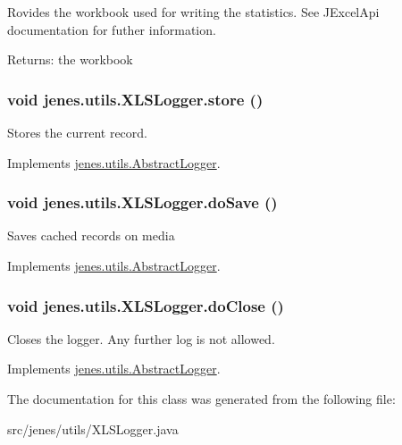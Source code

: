 Rovides the workbook used for writing the statistics. See JExcelApi documentation for futher information.

\begin{Desc}
\item[Returns:]the workbook \end{Desc}
\hypertarget{classjenes_1_1utils_1_1_x_l_s_logger_e6b3840ad6be8bdc558efaf6077d4ae4}{
\subsubsection[store]{\setlength{\rightskip}{0pt plus 5cm}void jenes.utils.XLSLogger.store ()}}
\label{classjenes_1_1utils_1_1_x_l_s_logger_e6b3840ad6be8bdc558efaf6077d4ae4}


Stores the current record. 

Implements \hyperlink{classjenes_1_1utils_1_1_abstract_logger_6acf83a83999e26ae4ed45cbf355111b}{jenes.utils.AbstractLogger}.\hypertarget{classjenes_1_1utils_1_1_x_l_s_logger_54c54393bf5a31442ebfc10517dfceea}{
\subsubsection[doSave]{\setlength{\rightskip}{0pt plus 5cm}void jenes.utils.XLSLogger.doSave ()}}
\label{classjenes_1_1utils_1_1_x_l_s_logger_54c54393bf5a31442ebfc10517dfceea}


Saves cached records on media 

Implements \hyperlink{classjenes_1_1utils_1_1_abstract_logger_41fcd50b050c467fe1b413fc5b49c167}{jenes.utils.AbstractLogger}.\hypertarget{classjenes_1_1utils_1_1_x_l_s_logger_cf58ddaa6873bcf626c9d24064a89b73}{
\subsubsection[doClose]{\setlength{\rightskip}{0pt plus 5cm}void jenes.utils.XLSLogger.doClose ()}}
\label{classjenes_1_1utils_1_1_x_l_s_logger_cf58ddaa6873bcf626c9d24064a89b73}


Closes the logger. Any further log is not allowed. 

Implements \hyperlink{classjenes_1_1utils_1_1_abstract_logger_5253672b3f3f81287db2fc604ca921a9}{jenes.utils.AbstractLogger}.

The documentation for this class was generated from the following file:\begin{CompactItemize}
\item 
src/jenes/utils/XLSLogger.java\end{CompactItemize}
